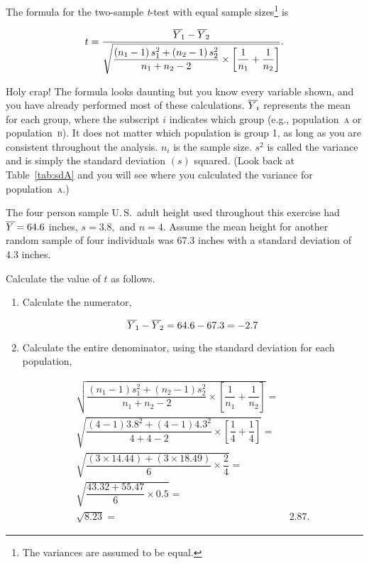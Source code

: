 \documentclass[12pt]{exam}
\newcommand*\meanY{\overline{Y\kern1.67pt}\kern-1.67pt}
\newcommand*\ttest{\emph{t}-test}
\newcommand*\popa{population~\textsc{a}} %
\newcommand*\popb{population~\textsc{b}} %
\begin{document}
\begin{questions}
The formula for the two-sample \ttest{} with equal sample sizes\footnote{The variances are assumed to be equal.} is


\begin{equation*}
t = \dfrac{\meanY_1 - \meanY_2}{\sqrt{\dfrac{\left(n_1 - 1\right)s_1^2 + \left(n_2 - 1\right)s_2^2}{n_1 + n_2 -2} \times \left[\dfrac{1}{n_1} + \dfrac{1}{n_2}\right]}}.
\end{equation*}

Holy crap! The formula looks daunting but you know every variable shown, and you have already performed most of these calculations. $\meanY_{i}$ represents the mean for each group, where the subscript $i$ indicates which group (e.g., \popa{} or \popb{}). It does not matter which population is group 1, as long as you are consistent throughout the analysis. $n_i$ is the sample size. $s^2$ is called the variance and is simply the standard deviation $\left(s\right)$ squared. (Look back at Table~\ref{tab:sdA} and you will see where you calculated the variance for \popa{}.) 

The four person sample U.\,S.\ adult height used throughout this exercise had $\meanY = 64.6$ inches, $s = 3.8,$ and $n = 4.$ Assume the mean height for another random sample of four individuals was 67.3 inches with a standard deviation of 4.3 inches.

Calculate the value of $t$ as follows.

\begin{enumerate}

\item Calculate the numerator,

\begin{equation*}
\meanY_1 - \meanY_2 = 64.6 - 67.3 = -2.7
\end{equation*}

\item Calculate the entire denominator, using the standard deviation for each population,

\begin{equation*}
	\begin{split}
		\sqrt{\dfrac{\left(n_1 - 1\right)s_1^2 + \left(n_2 - 1\right)s_2^2}{n_1 + n_2 -2} \times \left[\dfrac{1}{n_1} + \dfrac{1}{n_2}\right]} = & \\
%
		\sqrt{\dfrac{\left(4 - 1\right)3.8^2 + \left(4 - 1\right)4.3^2}{4 + 4 - 2} \times \left[\dfrac{1}{4} + \dfrac{1}{4}\right]} = & \\
%
		\sqrt{\dfrac{\left(3 \times 14.44\right) + \left(3 \times18.49 \right)}{6} \times \dfrac{2}{4}} = & \\
%
		\sqrt{\dfrac{43.32 + 55.47}{6} \times 0.5} = & \\
		\sqrt{8.23} = &\ 2.87.
	\end{split}
\end{equation*}


\end{enumerate}
\end{questions}
\end{document}
